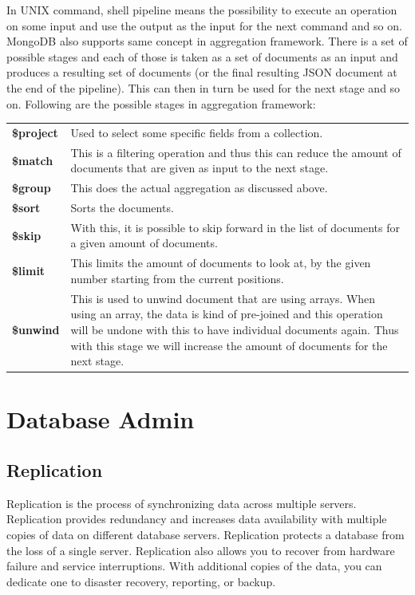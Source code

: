 \documentclass[12pt]{article}
\begin{document}
\begin{bashcode}
\begin{bashcode}
In UNIX command, shell pipeline means the possibility to execute an
operation on some input and use the output as the input for the next
command and so on. MongoDB also supports same concept in aggregation
framework. There is a set of possible stages and each of those is taken
as a set of documents as an input and produces a resulting set of
documents (or the final resulting JSON document at the end of the
pipeline). This can then in turn be used for the next stage and so on.
Following are the possible stages in aggregation framework: \\

\begin{tabular}{lp{24em}}
    \bfseries \$project & Used to select some specific fields from a collection. \\
    \bfseries \$match & This is a filtering operation and thus this can reduce the amount of documents that are given as input to the next stage. \\
    \bfseries \$group & This does the actual aggregation as discussed above. \\
    \bfseries \$sort & Sorts the documents. \\
    \bfseries \$skip & With this, it is possible to skip forward in the list of documents for a given amount of documents. \\
    \bfseries \$limit & This limits the amount of documents to look at, by the given number starting from the current positions. \\
    \bfseries \$unwind & This is used to unwind document that are using arrays. When using an array, the data is kind of pre-joined and this operation will be undone with this to have individual documents again. Thus with this stage we will increase the amount of documents for the next stage. \\
\end{tabular}

\newpage
\section{Database Admin}
\subsection{Replication}

Replication is the process of synchronizing data across multiple
servers. Replication provides redundancy and increases data availability
with multiple copies of data on different database servers. Replication
protects a database from the loss of a single server. Replication also
allows you to recover from hardware failure and service interruptions.
With additional copies of the data, you can dedicate one to disaster
recovery, reporting, or backup.


\end{bashcode}
\end{bashcode}
\end{document}
